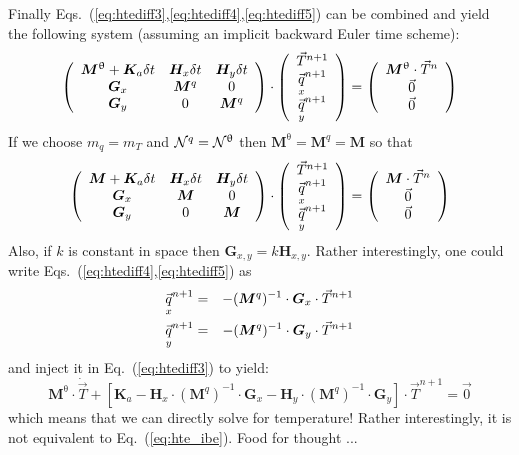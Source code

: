 Finally Eqs.~(\ref{eq:htediff3},\ref{eq:htediff4},\ref{eq:htediff5}) 
can be combined and yield the following system (assuming an implicit backward 
Euler time scheme):
\[
\left(
\begin{array}{ccc}
{\bm M}^\uptheta + {\bm K}_a \delta t & {\bm H}_x \delta t  & {\bm H}_y \delta t \\
{\bm G}_x & {\bm M}^q & 0 \\
{\bm G}_y & 0 & {\bm M}^q 
\end{array}
\right)
\cdot
\left(
\begin{array}{c}
\vec{T}^{n+1}\\
\vec{\underset{\tiny x}{q}}^{n+1}\\
\vec{\underset{\tiny y}{q}}^{n+1}
\end{array}
\right)
=
\left(
\begin{array}{c}
{\bm M}^\uptheta \cdot \vec{T}^n\\
\vec{0} \\
\vec{0}
\end{array}
\right)
\]
If we choose $m_q=m_T$ and ${\mathcal{N}}^q={\mathcal{N}}^\uptheta$ then
${\bm M}^\uptheta = {\bm M}^q = {\bm M}$ 
so that 
\[
\left(
\begin{array}{ccc}
{\bm M} + {\bm K}_a \delta t & {\bm H}_x \delta t & {\bm H}_y \delta t\\
{\bm G}_x & {\bm M} & 0 \\
{\bm G}_y & 0 & {\bm M}
\end{array}
\right)
\cdot
\left(
\begin{array}{c}
\vec{T}^{n+1}\\
\vec{\underset{\tiny x}{q}}^{n+1}\\
\vec{\underset{\tiny y}{q}}^{n+1}
\end{array}
\right)
=
\left(
\begin{array}{c}
{\bm M} \cdot \vec{T}^n\\
\vec{0} \\
\vec{0}
\end{array}
\right)
\]
Also, if $k$ is constant in space then ${\bm G}_{x,y}=k {\bm H}_{x,y}$. 
Rather interestingly, one could write Eqs.~(\ref{eq:htediff4},\ref{eq:htediff5}) 
as
\begin{eqnarray}
\vec{\underset{\tiny x}{q}}^{n+1} &=& - ({\bm M}^q)^{-1} \cdot {\bm G}_x \cdot \vec{T}^{n+1} \\
\vec{\underset{\tiny y}{q}}^{n+1} &=& - ({\bm M}^q)^{-1} \cdot {\bm G}_y \cdot \vec{T}^{n+1}
\end{eqnarray}
and inject it in Eq.~(\ref{eq:htediff3}) to yield:
\begin{equation}
{\bm M}^\uptheta \cdot \dot{\vec{T}} + [ {\bm K}_a 
- {\bm H}_x \cdot ({\bm M}^q)^{-1} \cdot {\bm G}_x 
- {\bm H}_y \cdot ({\bm M}^q)^{-1} \cdot {\bm G}_y ] \cdot \vec{T}^{n+1}
=\vec{0} 
\end{equation}
which means that we can directly solve for temperature! 
Rather interestingly, it is not equivalent to 
Eq.~(\ref{eq:hte_ibe}). Food for thought ...

